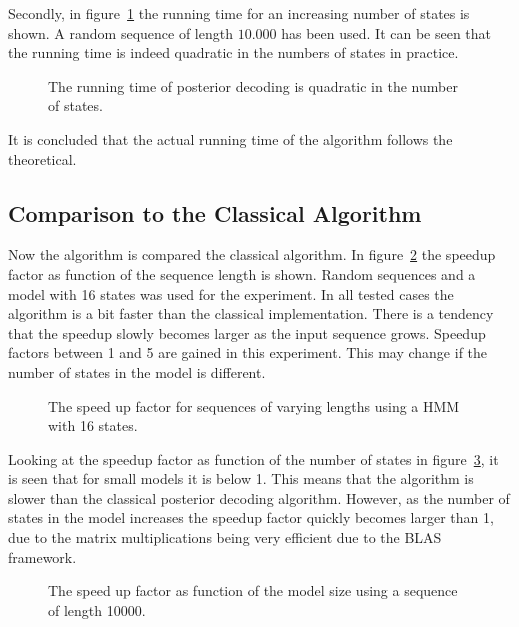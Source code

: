 Secondly, in figure~\ref{fig:posterior_N} the running time for an increasing
number of states is shown. A random sequence of length $10.000$ has been used. It
can be seen that the running time is indeed quadratic in the numbers of states
in practice.

\begin{figure}
  \centering
  
  \caption{The running time of posterior decoding is quadratic in the number of
    states.}
  \label{fig:posterior_N}
\end{figure}

It is concluded that the actual running time of the algorithm follows the
theoretical.

\subsection{Comparison to the Classical Algorithm}
\label{sec:comp-class-algor}

Now the algorithm is compared the classical algorithm. In
figure~\ref{fig:posterior_speedup_vs_sequence_length} the speedup factor as
function of the sequence length is shown. Random sequences and a model with 16
states was used for the experiment. In all tested cases the algorithm is a bit
faster than the classical implementation. There is a tendency that the speedup
slowly becomes larger as the input sequence grows. Speedup factors between 1
and 5 are gained in this experiment. This may change if the number of states in
the model is different.

\begin{figure}
  \centering
  
  \caption{The speed up factor for sequences of varying lengths using a HMM
    with 16 states.}
  \label{fig:posterior_speedup_vs_sequence_length}
\end{figure}

Looking at the speedup factor as function of the number of states in
figure~\ref{fig:posterior_speedup_vs_N}, it is seen that for small models it is
below 1. This means that the algorithm is slower than the classical posterior
decoding algorithm. However, as the number of states in the model increases the
speedup factor quickly becomes larger than 1, due to the matrix multiplications
being very efficient due to the BLAS framework.

\begin{figure}
  \centering
  
  \caption{The speed up factor as function of the model size using a sequence
    of length 10000.}
  \label{fig:posterior_speedup_vs_N}
\end{figure}

